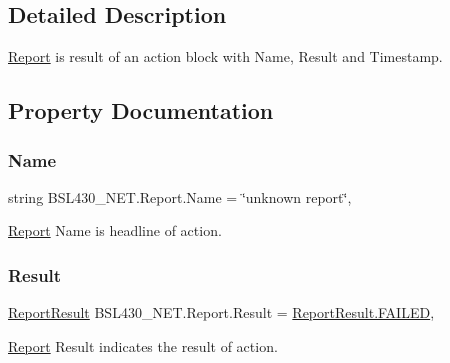 \subsection{Detailed Description}
\mbox{\hyperlink{class_b_s_l430___n_e_t_1_1_report}{Report}} is result of an action block with Name, Result and Timestamp. 



\subsection{Property Documentation}
\mbox{\label{class_b_s_l430___n_e_t_1_1_report_aabe691648841f12ec20a2d5899352916}} 
\subsubsection{\texorpdfstring{Name}{Name}}
{\footnotesize\ttfamily string B\+S\+L430\+\_\+\+N\+E\+T.\+Report.\+Name = \char`\"{}unknown report\char`\"{}\hspace{0.3cm}{\ttfamily [get]}, {\ttfamily [set]}}



\mbox{\hyperlink{class_b_s_l430___n_e_t_1_1_report}{Report}} Name is headline of action. 

\mbox{\label{class_b_s_l430___n_e_t_1_1_report_a44ea71eae01b3d80e083ae753fd6e5b0}} 
\subsubsection{\texorpdfstring{Result}{Result}}
{\footnotesize\ttfamily \mbox{\hyperlink{namespace_b_s_l430___n_e_t_a5329555917cbeec8fdb5a3fe35126138}{Report\+Result}} B\+S\+L430\+\_\+\+N\+E\+T.\+Report.\+Result = \mbox{\hyperlink{namespace_b_s_l430___n_e_t_a5329555917cbeec8fdb5a3fe35126138ab9e14d9b2886bcff408b85aefa780419}{Report\+Result.\+F\+A\+I\+L\+ED}}\hspace{0.3cm}{\ttfamily [get]}, {\ttfamily [set]}}



\mbox{\hyperlink{class_b_s_l430___n_e_t_1_1_report}{Report}} Result indicates the result of action. 

